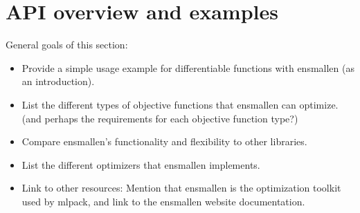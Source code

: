 \section{API overview and examples}
\label{sec:api}

General goals of this section:

\begin{itemize}
  \item Provide a simple usage example for differentiable functions with
ensmallen (as an introduction).

  \item List the different types of objective functions that ensmallen can
optimize.  (and perhaps the requirements for each objective function type?)

  \item Compare ensmallen's functionality and flexibility to other libraries.

  \item List the different optimizers that ensmallen implements.

  \item Link to other resources: Mention that ensmallen is the optimization
toolkit used by mlpack, and link to the ensmallen website documentation.
\end{itemize}

